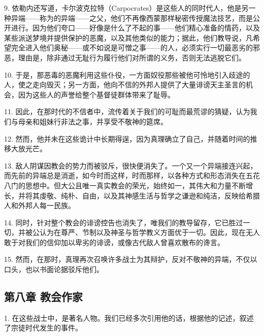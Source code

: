 9. 依勒内还写道，卡尔波克拉特（Carpocrates）是这些人的同时代人，他是另一种异端——称为的异端——之父，他们不再像西蒙那样秘密传授魔法技艺，而是公开进行。因为他们夸口——好像是什么了不起的事——他们精心准备的情药，以及某些派送梦境并提供保护的恶魔，以及其他类似的能力；据此，他们教导说，凡希望完全进入他们奥秘——或不如说是可憎之事——的人，必须实行一切最恶劣的邪恶，理由是，除非通过无耻行为履行他们对所谓的义务，否则无法逃脱它们。\par

10. 于是，那恶毒的恶魔利用这些仆役，一方面奴役那些被他可怜地引入歧途的人，使之走向毁灭；另一方面，他向不信的外邦人提供了大量诽谤天主圣言的机会，因为这些人的声誉给整个基督徒群体带来了耻辱。\par

11. 因此，在那时代的不信者中，流传着关于我们的可耻而最荒谬的猜疑，认为我们与母亲和姐妹行非法之事，并享受不敬神的筵席。\par

12. 然而，他并未在这些诡计中长期得逞，因为真理确立了自己，并随着时间的推移大放光芒。\par

13. 敌人阴谋因教会的势力而被驳斥，很快便消失了。一个又一个异端接连兴起，而先前的异端总是消逝，如今时而这样，时而那样，以各种方式和形态消失在五花八门的思想中。但大公且唯一真实教会的荣光，始终如一，其伟大和力量不断增长，并将其虔敬、纯朴、自由，以及其神感生活与哲学之谦逊和纯洁，反映给希腊人和外邦人每一民族。\par

14. 同时，针对整个教会的诽谤控告也消失了，唯我们的教导留存，它已胜过一切，并被公认为在尊严、节制以及神圣与哲学教义方面优于一切。因此，现在无人敢于对我们的信仰加以卑劣的诽谤，或像古代敌人曾喜欢散布的谗言。\par

15. 然而，在那时，真理再次召唤许多战士为其辩护，反对不敬神的异端，不仅以口头，也以书面论据驳斥他们。\par


\subsection{第八章 教会作家}

1. 在这些战士中，是著名人物。我们已经多次引用他的话，根据他的记述，叙述了宗徒时代发生的事件。\par

